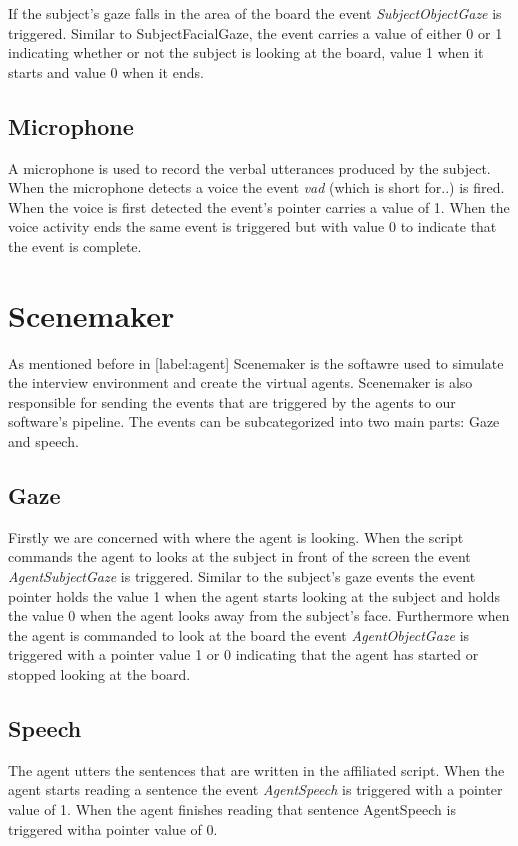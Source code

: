 \documentclass[12pt, a4paper, fleqn]{memoir}%
\begin{document}
If the subject's gaze falls in the area of the board the event \textit{SubjectObjectGaze} is triggered. Similar to SubjectFacialGaze, the event carries a value of either 0 or 1 indicating whether or not the subject is looking at the board, value 1 when it starts and value 0 when it ends.

\subsection{Microphone}
A microphone is used to record the verbal utterances produced by the subject. When the microphone detects a voice the event \textit{vad} (which is short for..) is fired. When the voice is first detected the event's pointer carries a value of 1. When the voice activity ends the same event is triggered but with value 0 to indicate that the event is complete.

\section{Scenemaker}
\label{sec:Scenemaker}
As mentioned before in [label:agent] Scenemaker is the softawre used to simulate the interview environment and create the virtual agents. Scenemaker is also responsible for sending the events that are triggered by the agents to our software's pipeline. The events can be subcategorized into two main parts: Gaze and speech.

\subsection{Gaze}
Firstly we are concerned with where the agent is looking. When the script commands the agent to looks at the subject in front of the screen the event \textit{AgentSubjectGaze} is triggered. Similar to the subject's gaze events the event pointer holds the value 1 when the agent starts looking at the subject and holds the value 0 when the agent looks away from the subject's face.
Furthermore when the agent is commanded to look at the board the event \textit{AgentObjectGaze} is triggered with a pointer value 1 or 0 indicating that the agent has started or stopped looking at the board.

\subsection{Speech}
The agent utters the sentences that are written in the affiliated script. When the agent starts reading a sentence the event \textit{AgentSpeech} is triggered with a pointer value of 1. When the agent finishes reading that sentence AgentSpeech is triggered witha pointer value of 0.
\end{document}
